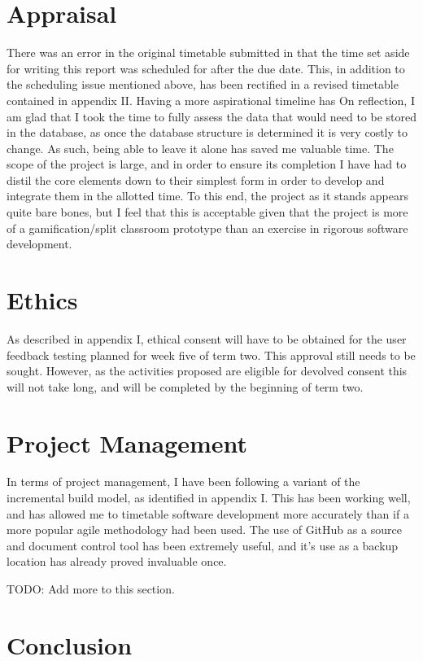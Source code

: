 \documentclass[10pt,a4paper]{report}
\begin{document}
\section*{Appraisal}
There was an error in the original timetable submitted in that the time set aside for writing this report was scheduled for after the due date. This, in addition to the scheduling issue mentioned above, has been rectified in a revised timetable contained in appendix II. Having a more aspirational timeline has  On reflection, I am glad that I took the time to fully assess the data that would need to be stored in the database, as once the database structure is determined it is very costly to change. As such, being able to leave it alone has saved me valuable time. The scope of the project is large, and in order to ensure its completion I have had to distil the core elements down to their simplest form in order to develop and integrate them in the allotted time. To this end, the project as it stands appears quite bare bones, but I feel that this is acceptable given that the project is more of a gamification/split classroom prototype than an exercise in rigorous software development.

\section*{Ethics}
As described in appendix I, ethical consent will have to be obtained for the user feedback testing planned for week five of term two. This approval still needs to be sought. However, as the activities proposed are eligible for devolved consent this will not take long, and will be completed by the beginning of term two.

\section*{Project Management}
In terms of project management, I have been following a variant of the incremental build model, as identified in appendix I. This has been working well, and has allowed me to timetable software development more accurately than if a more popular agile methodology had been used. The use of GitHub as a source and document control tool has been extremely useful, and it's use as a backup location has already proved invaluable once. 

TODO: Add more to this section.

\section*{Conclusion}
\end{document}
